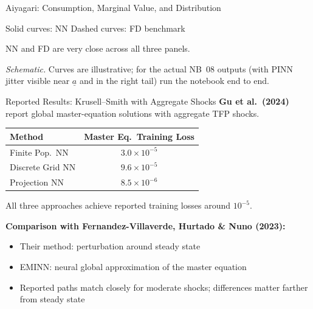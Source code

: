 \documentclass[aspectratio=169,11pt]{beamer}
\newcommand{\ubar}[1]{\underline{#1}}
\begin{document}
\begin{frame}[shrink=2]{Aiyagari: Consumption, Marginal Value, and Distribution}
\vspace{0.1em}
\begin{center}
{\scriptsize Solid curves: NN \qquad Dashed curves: FD benchmark}
\end{center}

\vspace{0.1em}
{\small NN and FD are very close across all three panels.}

\vspace{0.05em}
{\scriptsize\emph{Schematic.}  Curves are illustrative; for the actual NB~08 outputs (with PINN jitter visible near $\ubar a$ and in the right tail) run the notebook end to end.}
\end{frame}

\begin{frame}{Reported Results: Krusell--Smith with Aggregate Shocks}
\footnotesize
\textbf{Gu et al.\ (2024)} report global master-equation solutions with aggregate TFP shocks.

\vspace{0.1em}
\begin{center}
\footnotesize
\renewcommand{\arraystretch}{1.1}
\begin{tabular}{lc}
\toprule
\textbf{Method} & \textbf{Master Eq.\ Training Loss} \\
\midrule
Finite Pop.\ NN & $3.0 \times 10^{-5}$ \\
Discrete Grid NN & $9.6 \times 10^{-5}$ \\
Projection NN & $8.5 \times 10^{-6}$ \\
\bottomrule
\end{tabular}
\end{center}

\vspace{0.15em}
All three approaches achieve reported training losses around $10^{-5}$.

\vspace{0.1em}
\textbf{Comparison with Fernandez-Villaverde, Hurtado \& Nuno (2023):}
\begin{itemize}\itemsep1pt
    \item Their method: perturbation around steady state
    \item EMINN: neural global approximation of the master equation
    \item Reported paths match closely for moderate shocks; differences matter farther from steady state
\end{itemize}
\end{frame}
\end{document}
